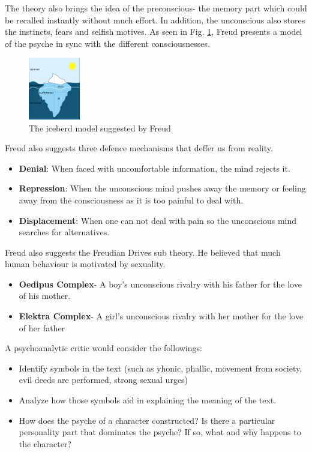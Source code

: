 \documentclass[11pt, twocolumn]{article}
\begin{document}
\begin{twocolumn}
The theory also brings the idea of the preconscious- the memory part which could be recalled instantly without much effort. In addition, the unconscious also stores the instincts, fears and selfish motives.
As seen in Fig. \ref{fig:iceberg}, Freud presents a model of the psyche in sync with the different consciousnesses.

\begin{figure}[h!]
        \centering
        \includegraphics[width=0.2\textwidth]{assets/freud_iceberg.png}
        \caption{\textsf{The iceberd model suggested by Freud}}
        \label{fig:iceberg}
\end{figure}

Freud also suggests three defence mechanisms that deffer us from reality.
\begin{itemize}
        \item \textbf{Denial}: When faced with uncomfortable information, the mind rejects it.
        \item \textbf{Repression}: When the unconscious mind pushes away the memory or feeling away from the consciousness as it is too painful to deal with.
        \item \textbf{Displacement}: When one can not deal with pain so the unconscious mind searches for alternatives.
\end{itemize}

Freud also suggests the Freudian Drives sub theory. He believed that much human behaviour is motivated by sexuality.
\begin{itemize}
        \item \textbf{Oedipus Complex}- A boy's unconscious rivalry with his father for the love of his mother.
        \item \textbf{Elektra Complex}- A girl’s unconscious rivalry with her mother for the love of her father
\end{itemize}

A psychoanalytic critic would consider the followings:
\begin{itemize}
        \item Identify symbols in the text (such as yhonic, phallic, movement from society, evil deeds are performed, strong sexual urges)
        \item Analyze how those symbols aid in explaining the meaning of the text.
        \item How does the psyche of a character constructed? Is there a particular personality part that dominates the psyche? If so, what and why happens to the character?
\end{itemize}

\end{twocolumn}
\end{document}
